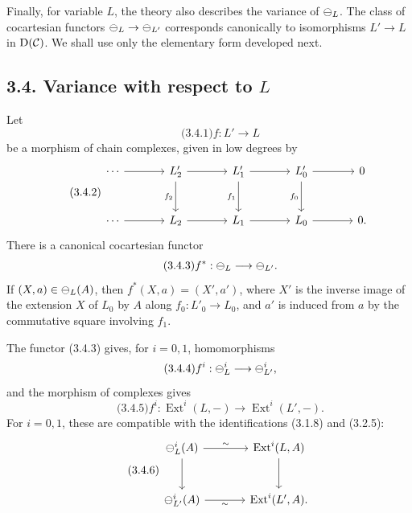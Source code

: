 \documentclass[11pt]{article}
\providecommand{\Ext}{\operatorname{Ext}}
\begin{document}
Finally, for variable \(L\), the theory also describes the variance of \(\mathcal\Psi_L\).  The class of cocartesian functors \(\mathcal\Psi_L\to\mathcal\Psi_{L'}\) corresponds canonically to isomorphisms \(L'\to L\) in \(\mathrm D(\mathcal C)\).  We shall use only the elementary form developed next.

\subsection*{3.4. Variance with respect to \(L\)}
Let
\begin{equation}\qquad\text{(3.4.1)}
  f:L'\longrightarrow L
\end{equation}
be a morphism of chain complexes, given in low degrees by
\begin{equation}\qquad\text{(3.4.2)}
\begin{tikzcd}[column sep=large,row sep=large]
\cdots\arrow[r]&L'_2\arrow[r]\arrow[d,"f_2"']&L'_1\arrow[r]\arrow[d,"f_1"']&L'_0\arrow[r]\arrow[d,"f_0"']&0\\
\cdots\arrow[r]&L_2\arrow[r]&L_1\arrow[r]&L_0\arrow[r]&0.
\end{tikzcd}
\end{equation}
There is a canonical cocartesian functor
\begin{equation}\qquad\text{(3.4.3)}
  f^*:\mathcal\Psi_L\longrightarrow\mathcal\Psi_{L'}.
\end{equation}
If \((X,a)\in\mathcal\Psi_L(A)\), then \(f^*(X,a)=(X',a')\), where \(X'\) is the inverse image of the extension \(X\) of \(L_0\) by \(A\) along \(f_0:L'_0\to L_0\), and \(a'\) is induced from \(a\) by the commutative square involving \(f_1\).

The functor (3.4.3) gives, for \(i=0,1\), homomorphisms
\begin{equation}\qquad\text{(3.4.4)}
  f^i:\mathcal\Psi_L^i\longrightarrow\mathcal\Psi_{L'}^i,
\end{equation}
and the morphism of complexes gives
\begin{equation}\qquad\text{(3.4.5)}
  f^i:\Ext^i(L,-)\longrightarrow\Ext^i(L',-).
\end{equation}
For \(i=0,1\), these are compatible with the identifications (3.1.8) and (3.2.5):
\begin{equation}\qquad\text{(3.4.6)}
\begin{tikzcd}[column sep=large,row sep=large]
\cPsi_L^i(A)\arrow[r,"\sim"]\arrow[d]&\Ext^i(L,A)\arrow[d]\\
\cPsi_{L'}^i(A)\arrow[r,"\sim"']&\Ext^i(L',A).
\end{tikzcd}
\end{equation}
\end{document}
